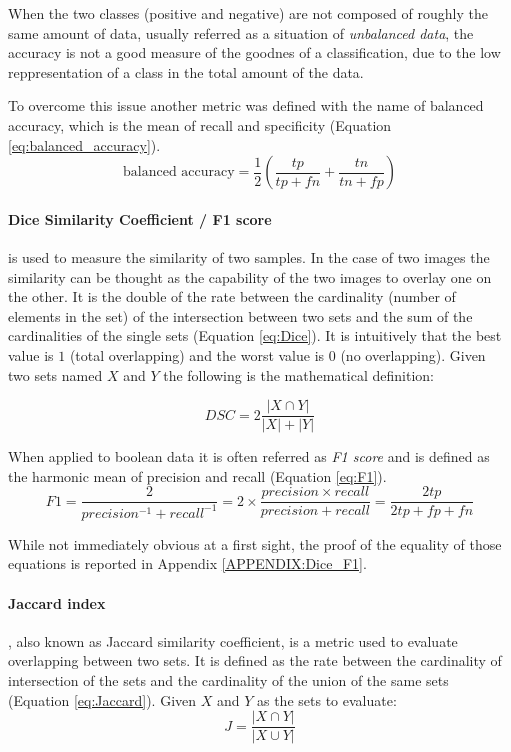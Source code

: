 \documentclass{standalone}
\begin{document}
When the two classes (positive and negative) are not composed of roughly the same amount of data, usually referred as a situation of \textit{unbalanced data}, the accuracy is not a good measure of the goodnes of a classification, due to the low reppresentation of a class in the total amount of the data.

To overcome this issue another metric was defined with the name of balanced accuracy, which is the mean of recall and specificity (Equation \ref{eq:balanced_accuracy}).
\begin{equation}\label{eq:balanced_accuracy}
    \text{balanced accuracy} = \frac{1}{2} \left( \frac{tp}{tp+fn} + \frac{tn}{tn+fp} \right) 
\end{equation}


\paragraph{Dice Similarity Coefficient / F1 score}

is used to measure the similarity of two samples. In the case of two images the similarity can be thought as the capability of the two images to overlay one on the other.
It is the double of the rate between the cardinality (number of elements in the set) of the intersection between two sets and the sum of the cardinalities of the single sets (Equation \ref{eq:Dice}). It is intuitively that the best value is $1$ (total overlapping) and the worst value is $0$ (no overlapping).
Given two sets named $X$ and $Y$ the following is the mathematical definition:

\begin{equation} \label{eq:Dice}
    DSC = 2\frac{|X \cap Y |}{|X| + |Y|}
\end{equation}

When applied to boolean data it is often referred as \textit{F1 score} and is defined as the harmonic mean of precision and recall (Equation \ref{eq:F1}).
\begin{equation} \label{eq:F1}
    F1 =\frac{2}{precision^{-1} + recall^{-1}} 
    = 2 \times \frac{precision \times recall}{precision + recall} 
    = \frac{2tp}{2tp + fp + fn}
\end{equation} 

While not immediately obvious at a first sight, the proof of the equality of those equations is reported in Appendix \ref{APPENDIX:Dice_F1}.


\paragraph{Jaccard index}
, also known as Jaccard similarity coefficient, is a metric used to evaluate overlapping between two sets. It is defined as the rate between the cardinality of intersection of the sets and the cardinality of the union of the same sets (Equation \ref{eq:Jaccard}). Given $X$ and $Y$ as the sets to evaluate:
\begin{equation}\label{eq:Jaccard}
    J = \frac{|X \cap Y|}{|X \cup Y|}
\end{equation}
\end{document}
